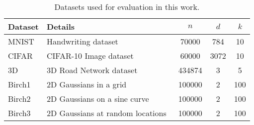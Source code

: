 \begin{table}[h]
\centering
\begin{tabular}{| l | l | c | c | c |}
\hline
{\bf Dataset} & {\bf Details} & $n$ & $d$ & $k$ \\
\hline \hline
MNIST & Handwriting dataset~\cite{mnist} & 70000 & 784 & 10 \\
\hline
CIFAR & CIFAR-10 Image dataset~\cite{cifar}  & 60000 & 3072 & 10 \\
\hline
3D & 3D Road Network dataset~\cite{3D} & 434874 & 3 & 5 \\
\hline
Birch1 & 2D Gaussians in a grid~\cite{birch} & 100000 & 2 & 100 \\
\hline
Birch2 & 2D Gaussians on a sine curve~\cite{birch} & 100000 & 2 & 100 \\
\hline
Birch3 & 2D Gaussians at random locations~\cite{birch} & 100000 & 2 & 100 \\
\hline
\end{tabular}
\caption{Datasets used for evaluation in this work.}
\end{table}